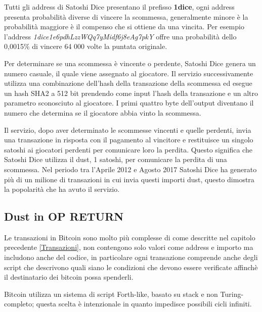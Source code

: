 Tutti gli address di Satoshi Dice presentano il prefisso \textbf{1dice}, ogni address presenta probabilità diverse di vincere la scommessa, generalmente minore è la probabilità maggiore è il compenso che si ottiene da una vincita. Per esempio l'address \textit{1dice1e6pdhLzzWQq7yMidf6j8eAg7pkY} offre una probabilità dello 0,0015\% di vincere 64 000 volte la puntata originale.

Per determinare se una scommessa è vincente o perdente, Satoshi Dice genera un numero casuale, il quale viene assegnato al giocatore. Il servizio successivamente utilizza una combinazione dell'hash della transazione della scommessa ed esegue un hash SHA2 a 512 bit prendendo come input l'hash della transazione e un altro parametro sconosciuto al giocatore. I primi quattro byte dell'output diventano il numero che determina se il giocatore abbia vinto la scommessa.

Il servizio, dopo aver determinato le scommesse vincenti e quelle perdenti, invia una transazione in risposta con il pagamento al vincitore e restituisce un singolo satoshi ai giocatori perdenti per comunicare loro la perdita. Questo significa che Satoshi Dice utilizza il dust, 1 satoshi, per comunicare la perdita di una scommessa. Nel periodo tra l'Aprile 2012 e Agosto 2017 Satoshi Dice ha generato più di un milione di transazioni in cui invia questi importi dust, questo dimostra la popolarità che ha avuto il servizio.
\subsection{Dust in OP RETURN}
Le transazioni in Bitcoin sono molto più complesse \cite{script} di come descritte nel capitolo precedente \ref{Transazioni}, non contengono solo valori come address e importo ma includono anche del codice, in particolare ogni transazione comprende anche degli script che descrivono quali siano le condizioni che devono essere verificate affinchè il destinatario dei bitcoin possa spenderli. 

Bitcoin utilizza un sistema di script Forth-like, basato su stack e non Turing-completo; questa scelta è intenzionale in quanto impedisce possibili cicli infiniti. 

